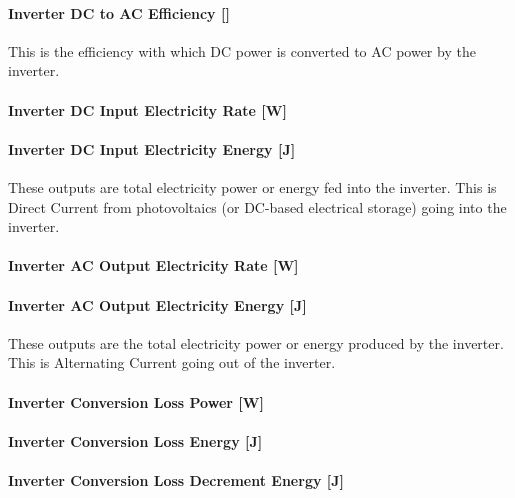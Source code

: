 \paragraph{Inverter DC to AC Efficiency {[]}}\label{inverter-dc-to-ac-efficiency}

This is the efficiency with which DC power is converted to AC power by the inverter.

\paragraph{Inverter DC Input Electricity Rate {[}W{]}}\label{inverter-dc-input-electricity-rate-w}

\paragraph{Inverter DC Input Electricity Energy {[}J{]}}\label{inverter-dc-input-electric-energy-j}

These outputs are total electricity power or energy fed into the inverter. This is Direct Current from photovoltaics (or DC-based electrical storage) going into the inverter.

\paragraph{Inverter AC Output Electricity Rate {[}W{]}}\label{inverter-ac-output-electric-power-w}

\paragraph{Inverter AC Output Electricity Energy {[}J{]}}\label{inverter-ac-output-electric-energy-j}

These outputs are the total electricity power or energy produced by the inverter. This is Alternating Current going out of the inverter.

\paragraph{Inverter Conversion Loss Power {[}W{]}}\label{inverter-conversion-loss-power-w}

\paragraph{Inverter Conversion Loss Energy {[}J{]}}\label{inverter-conversion-loss-energy-j}

\paragraph{Inverter Conversion Loss Decrement Energy {[}J{]}}\label{inverter-conversion-loss-decrement-energy-j}

